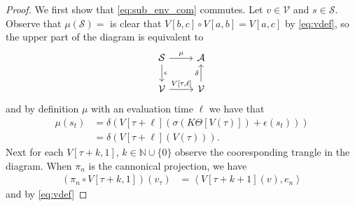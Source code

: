 \documentclass{article} %
\numberwithin{equation}{subsection}
\numberwithin{theorem}{subsection}
\def\scriptv{{\mathcal V}}
\def\scripta{{\mathcal A}}
\def\scripts{{\mathcal S}}
\begin{document}
\begin{proof}
	We first show that \eqref{eq:sub_env_com} commutes. Let $v \in \scriptv$ and $s \in \scripts$. Observe that
	$\mu(\scripts) = $
	 is clear that $V[b,c]\circ V[a,b] = V[a,c]$ by \eqref{eq:vdef}, so
	the upper part of the diagram is equivalent to
	\begin{equation}
		\begin{tikzcd}
			\scripts \arrow{r}{\mu}\arrow{d}{\epsilon} & \scripta \\
			\scriptv \arrow{r}{V[\tau, \ell]} & \scriptv \arrow{u}{\delta}
		\end{tikzcd}
	\end{equation}
	and by definition $\mu$ with an evaluation time $\ell$ we have that
	\begin{equation}
		\begin{aligned}
			\mu(s_t) &= \delta(V[\tau + \ell]( \sigma\left(K\Theta[V(\tau)]\right) + \epsilon(s_t))) \\
			 		 &= \delta(V[\tau + \ell](V(\tau))).
		\end{aligned}
	\end{equation}
	Next for each $V[\tau+k,1]$, $k\in \mathbb{N} \cup \{0\}$ observe the cooresponding trangle in the diagram. When $\pi_n$ is the cannonical projection, we have
	\begin{equation}
		\begin{aligned}
			\left(\pi_n \circ V[\tau+k, 1]\right)(v_\tau) &= \left\langle V[\tau+k+1](v), e_n\right\rangle
		\end{aligned}
	\end{equation}
	and by \eqref{eq:vdef}

\end{proof}
\end{document}

